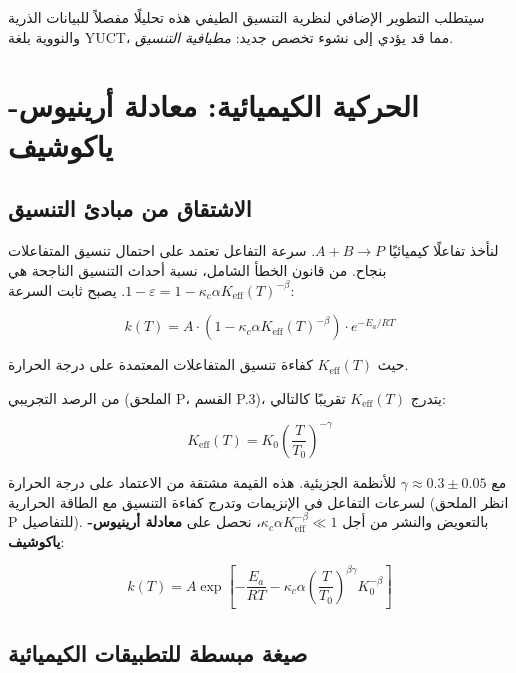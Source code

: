 \documentclass[12pt,a4paper]{article}
\theoremstyle{remark}
\newcommand{\Keff}{K_{\mathrm{eff}}}
\newcommand{\kappac}{\kappa_c}
\newcommand{\eps}{\varepsilon}
\begin{document}
	سيتطلب التطوير الإضافي لنظرية التنسيق الطيفي هذه تحليلًا مفصلاً للبيانات الذرية والنووية بلغة YUCT، مما قد يؤدي إلى نشوء تخصص جديد: \emph{مطيافية التنسيق}.
	
	\section{الحركية الكيميائية: معادلة أرينيوس-ياكوشيف}
	\label{sec:kinetics}
	
	\subsection{الاشتقاق من مبادئ التنسيق}
	
	لنأخذ تفاعلًا كيميائيًا $A + B \rightarrow P$. سرعة التفاعل تعتمد على احتمال تنسيق المتفاعلات بنجاح. من قانون الخطأ الشامل، نسبة أحداث التنسيق الناجحة هي $1 - \eps = 1 - \kappac \alpha \Keff(T)^{-\beta}$. يصبح ثابت السرعة:
	
	\begin{equation}
		k(T) = A \cdot (1 - \kappac \alpha \Keff(T)^{-\beta}) \cdot e^{-E_a/RT}
		\label{eq:arrhenius-base}
	\end{equation}
	
	حيث $\Keff(T)$ كفاءة تنسيق المتفاعلات المعتمدة على درجة الحرارة.
	
	من الرصد التجريبي (الملحق P، القسم P.3)، يتدرج $\Keff(T)$ تقريبًا كالتالي:
	
	\begin{equation}
		\Keff(T) = K_0 \left(\frac{T}{T_0}\right)^{-\gamma}
		\label{eq:K-T-scaling}
	\end{equation}
	
	مع $\gamma \approx 0.3 \pm 0.05$ للأنظمة الجزيئية. هذه القيمة مشتقة من الاعتماد على درجة الحرارة لسرعات التفاعل في الإنزيمات وتدرج كفاءة التنسيق مع الطاقة الحرارية (انظر الملحق P للتفاصيل). بالتعويض والنشر من أجل $\kappac \alpha \Keff^{-\beta} \ll 1$، نحصل على \textbf{معادلة أرينيوس-ياكوشيف}:
	
	\begin{equation}
		\boxed{k(T) = A \exp\left[-\frac{E_a}{RT} - \kappac \alpha \left(\frac{T}{T_0}\right)^{\beta\gamma} K_0^{-\beta}\right]}
		\label{eq:arrhenius-yakushev}
	\end{equation}
	
	\subsection{صيغة مبسطة للتطبيقات الكيميائية}
	
\end{document}
